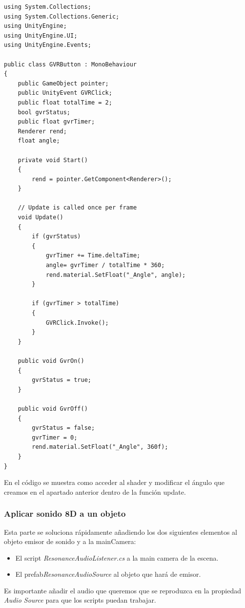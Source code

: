 \lstset{language=[sharp]C, breaklines=true, basicstyle=\footnotesize}
\begin{lstlisting}[frame=single, caption={GVRButton.cs}]
using System.Collections;
using System.Collections.Generic;
using UnityEngine;
using UnityEngine.UI;
using UnityEngine.Events;

public class GVRButton : MonoBehaviour
{
    public GameObject pointer;
    public UnityEvent GVRClick;
    public float totalTime = 2;
    bool gvrStatus;
    public float gvrTimer;
    Renderer rend;
    float angle;

    private void Start()
    {
        rend = pointer.GetComponent<Renderer>();
    }

    // Update is called once per frame
    void Update()
    {
        if (gvrStatus)
        {
            gvrTimer += Time.deltaTime;
            angle= gvrTimer / totalTime * 360;
            rend.material.SetFloat("_Angle", angle);
        }

        if (gvrTimer > totalTime)
        {
            GVRClick.Invoke();
        }
    }

    public void GvrOn()
    {
        gvrStatus = true;
    }

    public void GvrOff()
    {
        gvrStatus = false;
        gvrTimer = 0;
        rend.material.SetFloat("_Angle", 360f);
    }
}

\end{lstlisting}

\quad En el código se muestra como acceder al shader y modificar el ángulo que creamos en el apartado anterior dentro de la función update.\\

\subsubsection{Aplicar sonido 8D a un objeto}

\quad Esta parte se soluciona rápidamente añadiendo los dos siguientes elementos al objeto emisor de sonido y a la mainCamera:\\

\begin{itemize}
	\item El script \textit{ResonanceAudioListener.cs} a la main camera de la escena.
	\item El prefab\textit{ResonanceAudioSource} al objeto que hará de emisor.
\end{itemize}

\quad Es importante añadir el audio que queremos que se reproduzca en la propiedad \textit{Audio Source} para que los scripts puedan trabajar.\\

